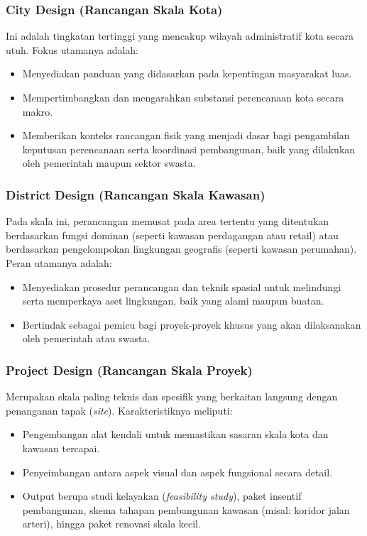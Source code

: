 \documentclass[../rumukota.tex]{subfiles}
\begin{document}
\subsubsection{City Design (Rancangan Skala Kota)}
Ini adalah tingkatan tertinggi yang mencakup wilayah administratif kota secara utuh. Fokus utamanya adalah:
\begin{itemize}
	\item Menyediakan panduan yang didasarkan pada kepentingan masyarakat luas.
	\item Mempertimbangkan dan mengarahkan substansi perencanaan kota secara makro.
	\item Memberikan konteks rancangan fisik yang menjadi dasar bagi pengambilan keputusan perencanaan serta koordinasi pembangunan, baik yang dilakukan oleh pemerintah maupun sektor swasta.
\end{itemize}

\subsubsection{District Design (Rancangan Skala Kawasan)}
Pada skala ini, perancangan memusat pada area tertentu yang ditentukan berdasarkan fungsi dominan (seperti kawasan perdagangan atau retail) atau berdasarkan pengelompokan lingkungan geografis (seperti kawasan perumahan). Peran utamanya adalah:
\begin{itemize}
	\item Menyediakan prosedur perancangan dan teknik spasial untuk melindungi serta memperkaya aset lingkungan, baik yang alami maupun buatan.
	\item Bertindak sebagai pemicu bagi proyek-proyek khusus yang akan dilaksanakan oleh pemerintah atau swasta.
\end{itemize}

\subsubsection{Project Design (Rancangan Skala Proyek)}
Merupakan skala paling teknis dan spesifik yang berkaitan langsung dengan penanganan tapak (\textit{site}). Karakteristiknya meliputi:
\begin{itemize}
	\item Pengembangan alat kendali untuk memastikan sasaran skala kota dan kawasan tercapai.
	\item Penyeimbangan antara aspek visual dan aspek fungsional secara detail.
	\item Output berupa studi kelayakan (\textit{feasibility study}), paket insentif pembangunan, skema tahapan pembangunan kawasan (misal: koridor jalan arteri), hingga paket renovasi skala kecil.
\end{itemize}
\end{document}
